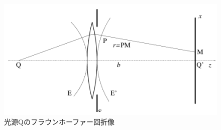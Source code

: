 \begin{figure}[htbp]\centering
	\includegraphics[width=\linewidth]{src/figures/principle/single_hole_2.png}
	\caption{光源Qのフラウンホーファー回折像}
	\label{fig:single_hole_interference_2}
\end{figure}
